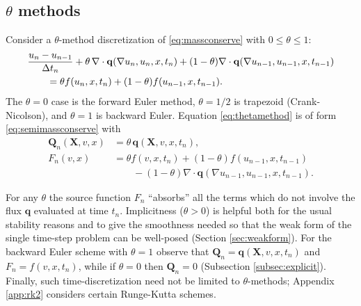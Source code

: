\documentclass[final,onefignum]{siamart190516}
\newcommand\bq{\mathbf{q}}
\newcommand\bQ{\mathbf{Q}}
\newcommand\bX{\mathbf{X}}
\newcommand{\Div}{\nabla\cdot}
\newcommand{\grad}{\nabla}
\begin{document}
\subsection{$\theta$ methods}  \label{subsec:thetamethods}  Consider a $\theta$-method discretization \cite{MortonMayers2005} of \eqref{eq:massconserve} with $0\le \theta \le 1$:
\begin{align}
  &\frac{u_n - u_{n-1}}{\Delta t_n} + \theta\, \Div \bq(\grad u_n,u_n,x,t_n) + (1-\theta) \Div \bq(\grad u_{n-1},u_{n-1},x,t_{n-1}) \label{eq:thetamethod} \\
  &\qquad =  \theta f(u_n,x,t_n) + (1-\theta) f(u_{n-1},x,t_{n-1}). \notag
\end{align}
The $\theta=0$ case is the forward Euler method, $\theta=1/2$ is trapezoid (Crank-Nicolson), and $\theta=1$ is backward Euler.  Equation \eqref{eq:thetamethod} is of form \eqref{eq:semimassconserve} with
\begin{align*}
\bQ_n(\bX,v,x) &= \theta\, \bq(\bX,v,x,t_n), \\
F_n(v,x)       &= \theta f(v,x,t_n) + (1-\theta) f(u_{n-1},x,t_{n-1}) \\
               &\qquad - (1-\theta) \Div \bq(\grad u_{n-1},u_{n-1},x,t_{n-1}).
\end{align*}

For any $\theta$ the source function $F_n$ ``absorbs'' all the terms which do not involve the flux $\bq$ evaluated at time $t_n$.  Implicitness ($\theta>0$) is helpful both for the usual stability reasons \cite{MortonMayers2005} and to give the smoothness needed so that the weak form of the single time-step problem can be well-posed (Section \ref{sec:weakform}).  For the backward Euler scheme with $\theta=1$ observe that $\bQ_n = \bq(\bX,v,x,t_n)$ and $F_n = f(v,x,t_n)$, while if $\theta=0$ then $\bQ_n=0$ (Subsection \ref{subsec:explicit}).  Finally, such time-discretization need not be limited to $\theta$-methods; Appendix \ref{app:rk2} considers certain Runge-Kutta schemes.
\end{document}
